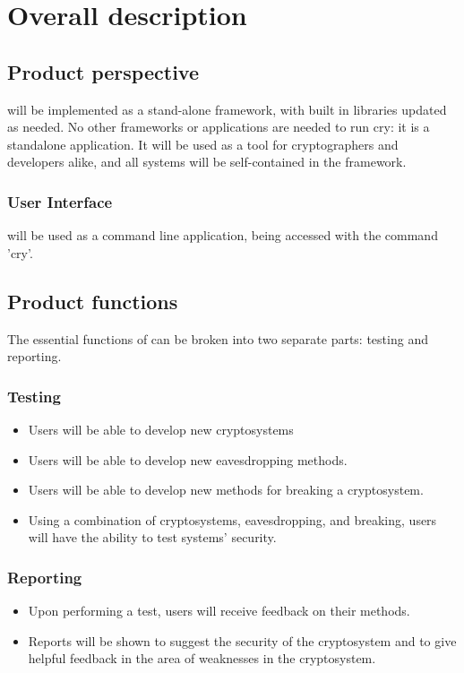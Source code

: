 \section{Overall description}
\dd


\subsection{Product perspective}

\cry{} will be implemented as a stand-alone framework, with built in libraries updated as needed. No other frameworks
or applications are needed to run cry: it is a standalone application. It will be used as a tool for cryptographers and
developers alike, and all systems will be self-contained in the framework.
  \subsubsection{User Interface}

  \cry{} will be used as a command line application, being accessed with the command 'cry'.


\subsection{Product functions}

The essential functions of \cry{} can be broken into two separate parts: testing and reporting.
  \subsubsection{Testing}
  \begin{itemize}
    \item Users will be able to develop new cryptosystems
    \item Users will be able to develop new eavesdropping methods.
    \item Users will be able to develop new methods for breaking a cryptosystem.
    \item Using a combination of cryptosystems, eavesdropping, and breaking, users will have the ability
    to test systems' security.
  \end{itemize}
  \subsubsection{Reporting}
  \begin{itemize}
    \item Upon performing a test, users will receive feedback on their methods.
    \item Reports will be shown to suggest the security of the cryptosystem and to give helpful feedback
    in the area of weaknesses in the cryptosystem.
  \end{itemize}

